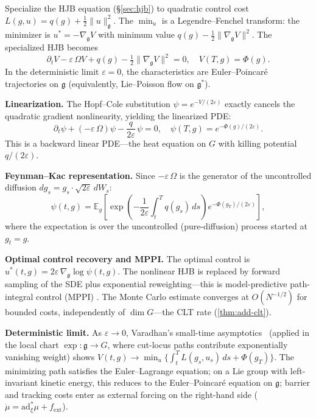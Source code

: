 \begin{remark}
Specialize the HJB equation (\S\ref{sec:hjb}) to quadratic control cost
$L(g,u) = q(g) + \tfrac{1}{2}\|u\|_{\mathfrak{g}}^2$.
The $\min_u$ is a Legendre--Fenchel transform: the minimizer is
$u^* = -\nabla_{\mathfrak{g}} V$ with minimum value
$q(g) - \tfrac{1}{2}\|\nabla_{\mathfrak{g}} V\|^2$.
The specialized HJB becomes
\[
\partial_t V - \varepsilon\,\Omega V + q(g)
  - \tfrac{1}{2}\|\nabla_{\mathfrak{g}} V\|^2 = 0,
\quad V(T,g) = \Phi(g).
\]
In the deterministic limit $\varepsilon = 0$, the characteristics are Euler--Poincar\'e trajectories on $\mathfrak{g}$ (equivalently, Lie--Poisson flow on $\mathfrak{g}^*$).

\medskip\noindent\textbf{Linearization.}
The Hopf--Cole substitution $\psi = e^{-V/(2\varepsilon)}$ exactly cancels the
quadratic gradient nonlinearity, yielding the linearized PDE:
\[
\partial_t \psi + (-\varepsilon\,\Omega)\psi
  - \frac{q}{2\varepsilon}\,\psi = 0,
\quad \psi(T,g) = e^{-\Phi(g)/(2\varepsilon)}.
\]
This is a backward linear PDE---the heat equation on $G$ with killing
potential $q/(2\varepsilon)$.

\medskip\noindent\textbf{Feynman--Kac representation.}
Since $-\varepsilon\,\Omega$ is the generator of the uncontrolled diffusion
$dg_s = g_s \cdot \sqrt{2\varepsilon}\,dW_s$:
\[
\psi(t,g) = \mathbb{E}_g\!\left[
  \exp\!\left(-\frac{1}{2\varepsilon}\int_t^T q(g_s)\,ds\right)
  e^{-\Phi(g_T)/(2\varepsilon)}
\right],
\]
where the expectation is over the uncontrolled (pure-diffusion) process
started at $g_t = g$.

\medskip\noindent\textbf{Optimal control recovery and MPPI.}
The optimal control is
$u^*(t,g) = 2\varepsilon\,\nabla_{\mathfrak{g}}\log\psi(t,g)$.
The nonlinear HJB is replaced by forward sampling of the SDE plus
exponential reweighting---this is model-predictive path-integral control
(MPPI) \cite{Kappen,Todorov}.
The Monte Carlo estimate converges at $O(N^{-1/2})$ for bounded costs, independently of $\dim G$---the CLT rate (\cref{thm:add-clt}).

\medskip\noindent\textbf{Deterministic limit.}
As $\varepsilon \to 0$, Varadhan's small-time
asymptotics~\cite{Varadhan1967} (applied in the local chart
$\exp\colon\mathfrak{g} \to G$, where cut-locus paths contribute
exponentially vanishing weight) shows
$V(t,g) \to \min_u\bigl\{\int_t^T L(g_s,u_s)\,ds + \Phi(g_T)\bigr\}$.
The minimizing path satisfies the Euler--Lagrange equation; on a Lie group
with left-invariant kinetic energy, this reduces to the Euler--Poincar\'e
equation on $\mathfrak{g}$; barrier and tracking costs enter as
external forcing on the right-hand side
($\dot\mu = \mathrm{ad}^*_\xi\mu + f_{\mathrm{ext}}$).
\end{remark}

